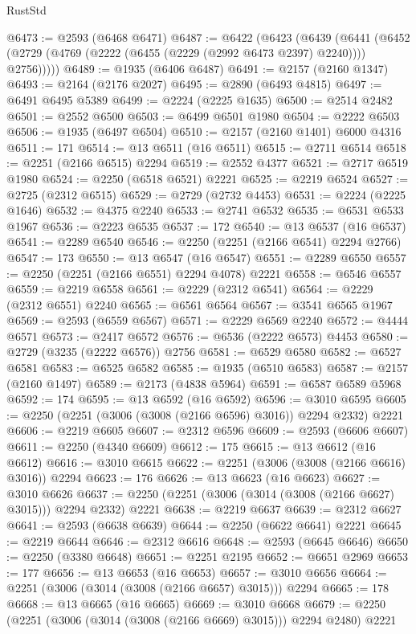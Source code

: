 \begin{lexlean}{RustStd}
\begin{coremodule}
@6473 := @2593 (@6468 @6471)
@6487 := @6422
    (@6423
      (@6439
        (@6441 (@6452 (@2729 (@4769 (@2222 (@6455 (@2229 (@2992 @6473 @2397) @2240)))) @2756)))))
@6489 := @1935 (@6406 @6487)
@6491 := @2157 (@2160 @1347)
@6493 := @2164 (@2176 @2027)
@6495 := @2890 (@6493 @4815)
@6497 := @6491 @6495 @5389
@6499 := @2224 (@2225 @1635)
@6500 := @2514 @2482
@6501 := @2552 @6500
@6503 := @6499 @6501 @1980
@6504 := @2222 @6503
@6506 := @1935 (@6497 @6504)
@6510 := @2157 (@2160 @1401) @6000 @4316
@6511 := 171
@6514 := @13 @6511 (@16 @6511)
@6515 := @2711 @6514
@6518 := @2251 (@2166 @6515) @2294
@6519 := @2552 @4377
@6521 := @2717 @6519 @1980
@6524 := @2250 (@6518 @6521) @2221
@6525 := @2219 @6524
@6527 := @2725 (@2312 @6515)
@6529 := @2729 (@2732 @4453)
@6531 := @2224 (@2225 @1646)
@6532 := @4375 @2240
@6533 := @2741 @6532
@6535 := @6531 @6533 @1967
@6536 := @2223 @6535
@6537 := 172
@6540 := @13 @6537 (@16 @6537)
@6541 := @2289 @6540
@6546 := @2250 (@2251 (@2166 @6541) @2294 @2766)
@6547 := 173
@6550 := @13 @6547 (@16 @6547)
@6551 := @2289 @6550
@6557 := @2250 (@2251 (@2166 @6551) @2294 @4078) @2221
@6558 := @6546 @6557
@6559 := @2219 @6558
@6561 := @2229 (@2312 @6541)
@6564 := @2229 (@2312 @6551) @2240
@6565 := @6561 @6564
@6567 := @3541 @6565 @1967
@6569 := @2593 (@6559 @6567)
@6571 := @2229 @6569 @2240
@6572 := @4444 @6571
@6573 := @2417 @6572
@6576 := @6536 (@2222 @6573) @4453
@6580 := @2729 (@3235 (@2222 @6576)) @2756
@6581 := @6529 @6580
@6582 := @6527 @6581
@6583 := @6525 @6582
@6585 := @1935 (@6510 @6583)
@6587 := @2157 (@2160 @1497)
@6589 := @2173 (@4838 @5964)
@6591 := @6587 @6589 @5968
@6592 := 174
@6595 := @13 @6592 (@16 @6592)
@6596 := @3010 @6595
@6605 := @2250 (@2251 (@3006 (@3008 (@2166 @6596) @3016)) @2294 @2332) @2221
@6606 := @2219 @6605
@6607 := @2312 @6596
@6609 := @2593 (@6606 @6607)
@6611 := @2250 (@4340 @6609)
@6612 := 175
@6615 := @13 @6612 (@16 @6612)
@6616 := @3010 @6615
@6622 := @2251 (@3006 (@3008 (@2166 @6616) @3016)) @2294
@6623 := 176
@6626 := @13 @6623 (@16 @6623)
@6627 := @3010 @6626
@6637 := @2250 (@2251 (@3006 (@3014 (@3008 (@2166 @6627) @3015))) @2294 @2332) @2221
@6638 := @2219 @6637
@6639 := @2312 @6627
@6641 := @2593 (@6638 @6639)
@6644 := @2250 (@6622 @6641) @2221
@6645 := @2219 @6644
@6646 := @2312 @6616
@6648 := @2593 (@6645 @6646)
@6650 := @2250 (@3380 @6648)
@6651 := @2251 @2195
@6652 := @6651 @2969
@6653 := 177
@6656 := @13 @6653 (@16 @6653)
@6657 := @3010 @6656
@6664 := @2251 (@3006 (@3014 (@3008 (@2166 @6657) @3015))) @2294
@6665 := 178
@6668 := @13 @6665 (@16 @6665)
@6669 := @3010 @6668
@6679 := @2250 (@2251 (@3006 (@3014 (@3008 (@2166 @6669) @3015))) @2294 @2480) @2221

\end{coremodule}
\end{lexlean}
